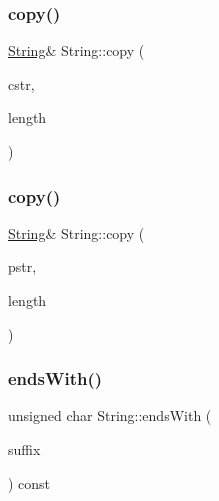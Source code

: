 \mbox{\label{class_string_a0ef9e2f459577668c16326054d8220c8}} 
\subsubsection{\texorpdfstring{copy()}{copy()}\hspace{0.1cm}{\footnotesize\ttfamily [1/2]}}
{\footnotesize\ttfamily \hyperlink{class_string}{String}\& String\+::copy (\begin{DoxyParamCaption}\item[{const char $\ast$}]{cstr,  }\item[{unsigned int}]{length }\end{DoxyParamCaption})\hspace{0.3cm}{\ttfamily [protected]}}

\mbox{\label{class_string_a8d349a2f3cf3c8cde32f8665660aec20}} 
\subsubsection{\texorpdfstring{copy()}{copy()}\hspace{0.1cm}{\footnotesize\ttfamily [2/2]}}
{\footnotesize\ttfamily \hyperlink{class_string}{String}\& String\+::copy (\begin{DoxyParamCaption}\item[{const \+\_\+\+\_\+\+Flash\+String\+Helper $\ast$}]{pstr,  }\item[{unsigned int}]{length }\end{DoxyParamCaption})\hspace{0.3cm}{\ttfamily [protected]}}

\mbox{\label{class_string_af96a205cd68121b2fbdf01f5e9b9bb31}} 
\subsubsection{\texorpdfstring{ends\+With()}{endsWith()}}
{\footnotesize\ttfamily unsigned char String\+::ends\+With (\begin{DoxyParamCaption}\item[{const \hyperlink{class_string}{String} \&}]{suffix }\end{DoxyParamCaption}) const}



